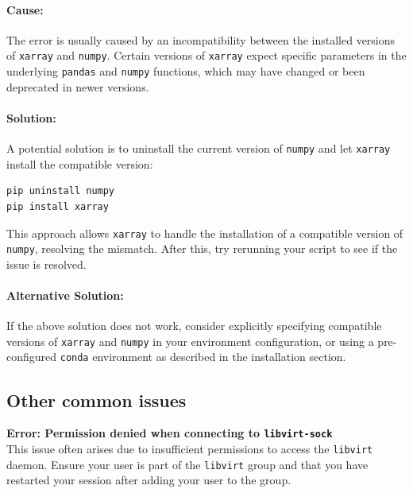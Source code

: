 \documentclass[a4paper,12pt]{article}
\begin{document}
\paragraph{Cause:}
The error is usually caused by an incompatibility between the installed versions of \texttt{xarray} and \texttt{numpy}. Certain versions of \texttt{xarray} expect specific parameters in the underlying \texttt{pandas} and \texttt{numpy} functions, which may have changed or been deprecated in newer versions.

\paragraph{Solution:}
A potential solution is to uninstall the current version of \texttt{numpy} and let \texttt{xarray} install the compatible version:

\begin{lstlisting}[language=bash]
pip uninstall numpy
pip install xarray
\end{lstlisting}

This approach allows \texttt{xarray} to handle the installation of a compatible version of \texttt{numpy}, resolving the mismatch. After this, try rerunning your script to see if the issue is resolved.

\paragraph{Alternative Solution:}
If the above solution does not work, consider explicitly specifying compatible versions of \texttt{xarray} and \texttt{numpy} in your environment configuration, or using a pre-configured \texttt{conda} environment as described in the installation section.

\subsection{Other common issues}
\textbf{Error: Permission denied when connecting to \texttt{libvirt-sock}} \\
This issue often arises due to insufficient permissions to access the \texttt{libvirt} daemon. Ensure your user is part of the \texttt{libvirt} group and that you have restarted your session after adding your user to the group.
\end{document}
